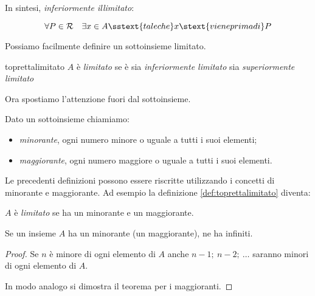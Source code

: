 \vspace{.8em}
In sintesi, \emph{inferiormente illimitato}:

\begin{newdef}{}{}
\[\forall P \in \retta \quad 
  \exists x \in A \sstext{tale che} x \stext{viene prima di} P\]
\end{newdef}


\vspace{.8em}
Possiamo facilmente definire un sottoinsieme limitato.

\begin{newdef}{}{toprettalimitato}
\(A\) è \emph{limitato} se è sia \emph{inferiormente limitato} sia 
\emph{superiormente limitato} 
\end{newdef}

\vspace{.8em}
Ora spostiamo l'attenzione fuori dal sottoinsieme.
\begin{newdef}{}{}
Dato un sottoinsieme chiamiamo:
\begin{itemize} [nosep]
\item \emph{minorante}, ogni numero minore o uguale a 
tutti i suoi elementi;
\item \emph{maggiorante}, ogni numero maggiore o uguale a 
tutti i suoi elementi.
\end{itemize}
\end{newdef}

Le precedenti definizioni possono essere riscritte utilizzando i concetti 
di minorante e maggiorante. 
Ad esempio la definizione \ref{def:toprettalimitato} diventa:

\begin{newdef}{}{}
\(A\) è \emph{limitato} se ha un minorante e un maggiorante.
\end{newdef}

\begin{newtheo}{}{}
Se un insieme \(A\) ha un minorante (un maggiorante), ne ha infiniti.
\end{newtheo}
\begin{proof}
Se \(n\) è minore di ogni elemento di \(A\) anche \(n-1;~n-2;~\dots\)
saranno minori di ogni elemento di \(A\).

In modo analogo si dimostra il teorema per i maggioranti.
\end{proof}

